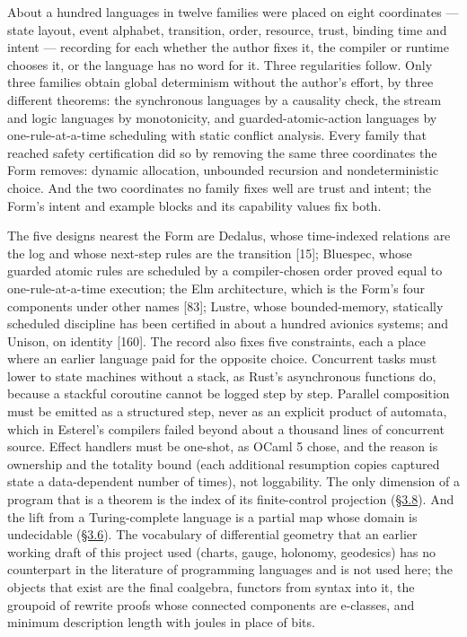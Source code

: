 \documentclass[10pt,letterpaper]{article}
\begin{document}
About a hundred languages in twelve families were placed on eight
coordinates --- state layout, event alphabet, transition, order,
resource, trust, binding time and intent --- recording for each whether
the author fixes it, the compiler or runtime chooses it, or the language
has no word for it. Three regularities follow. Only three families
obtain global determinism without the author's effort, by three
different theorems: the synchronous languages by a causality check, the
stream and logic languages by monotonicity, and guarded-atomic-action
languages by one-rule-at-a-time scheduling with static conflict
analysis. Every family that reached safety certification did so by
removing the same three coordinates the Form removes: dynamic
allocation, unbounded recursion and nondeterministic choice. And the two
coordinates no family fixes well are trust and intent; the Form's intent
and example blocks and its capability values fix both.

The five designs nearest the Form are Dedalus, whose time-indexed
relations are the log and whose next-step rules are the transition
{[}15{]}; Bluespec, whose guarded atomic rules are scheduled by a
compiler-chosen order proved equal to one-rule-at-a-time execution; the
Elm architecture, which is the Form's four components under other names
{[}83{]}; Lustre, whose bounded-memory, statically scheduled discipline
has been certified in about a hundred avionics systems; and Unison, on
identity {[}160{]}. The record also fixes five constraints, each a place
where an earlier language paid for the opposite choice. Concurrent tasks
must lower to state machines without a stack, as Rust's asynchronous
functions do, because a stackful coroutine cannot be logged step by
step. Parallel composition must be emitted as a structured step, never
as an explicit product of automata, which in Esterel's compilers failed
beyond about a thousand lines of concurrent source. Effect handlers must
be one-shot, as OCaml 5 chose, and the reason is ownership and the
totality bound (each additional resumption copies captured state a
data-dependent number of times), not loggability. The only dimension of
a program that is a theorem is the index of its finite-control
projection
(\href{https://research.openie.dev/papers/rce/\#38-behaviour-equivalence-and-dimension}{§3.8}).
And the lift from a Turing-complete language is a partial map whose
domain is undecidable
(\href{https://research.openie.dev/papers/rce/\#36-one-ecosystem-lossless-and-the-universality-thesis}{§3.6}).
The vocabulary of differential geometry that an earlier working draft of
this project used (charts, gauge, holonomy, geodesics) has no
counterpart in the literature of programming languages and is not used
here; the objects that exist are the final coalgebra, functors from
syntax into it, the groupoid of rewrite proofs whose connected
components are e-classes, and minimum description length with joules in
place of bits.
\end{document}
